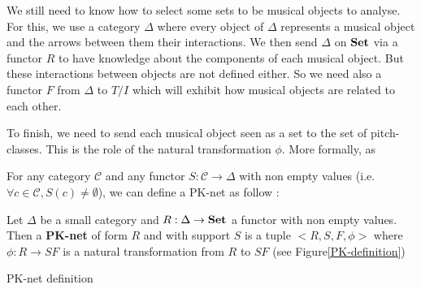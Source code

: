 We still need to know how to select some sets to be musical objects to analyse. For this, we use a category $\Delta$ where every object of $\Delta$ represents a musical object and the arrows between them their interactions. We then send  $\Delta$ on $\bf Set$ via a functor $R$ to have knowledge about the components of each musical object. But these interactions between objects are not defined either. So we need also a functor $F$ from $\Delta$ to $T/I$ which will exhibit how musical objects are related to each other.

To finish, we need to send each musical object seen as a set to the set of pitch-classes. This is the role of the natural transformation $\phi$. More formally,  as 

\begin{defn}
    For any category $\mathcal{C}$ and any functor $S:\mathcal{C} \rightarrow \Delta$ with non empty values (i.e. $\forall c \in \mathcal{C}, S(c) \neq \emptyset$), we can define a PK-net as follow : 

    Let $\Delta$ be a small category and $R : \Delta \rightarrow \bf Set$ a functor with non empty values. Then a \textbf{PK-net} of form $R$ and with support $S$ is a tuple $\big<R,S,F,\phi\big>$ where $\phi : R \rightarrow SF$ is a natural transformation from $R$ to $SF$ (see Figure\ref{PK-definition})

    \begin{tzcategory}{\caption{PK-net definition}
        \label{PK-definition}}
    \end{tzcategory}
\end{defn}

